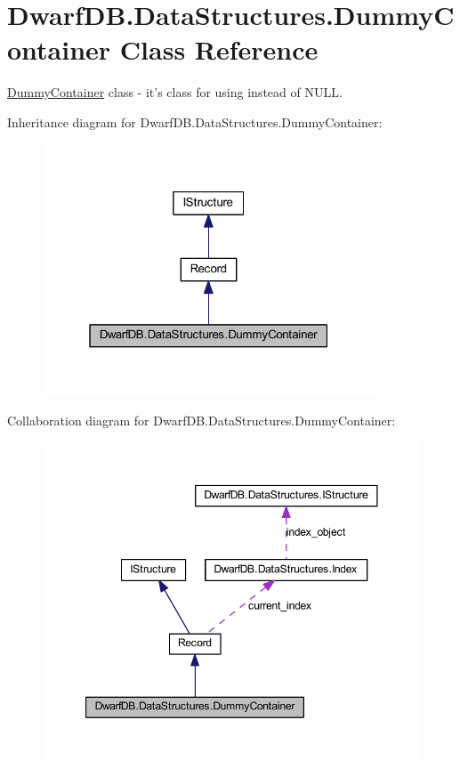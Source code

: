 \hypertarget{class_dwarf_d_b_1_1_data_structures_1_1_dummy_container}{
\section{DwarfDB.DataStructures.DummyContainer Class Reference}
\label{class_dwarf_d_b_1_1_data_structures_1_1_dummy_container}
}


\hyperlink{class_dwarf_d_b_1_1_data_structures_1_1_dummy_container}{DummyContainer} class -\/ it's class for using instead of NULL.  




Inheritance diagram for DwarfDB.DataStructures.DummyContainer:\nopagebreak
\begin{figure}[H]
\begin{center}
\leavevmode
\includegraphics[width=280pt]{class_dwarf_d_b_1_1_data_structures_1_1_dummy_container__inherit__graph}
\end{center}
\end{figure}


Collaboration diagram for DwarfDB.DataStructures.DummyContainer:\nopagebreak
\begin{figure}[H]
\begin{center}
\leavevmode
\includegraphics[width=347pt]{class_dwarf_d_b_1_1_data_structures_1_1_dummy_container__coll__graph}
\end{center}
\end{figure}

